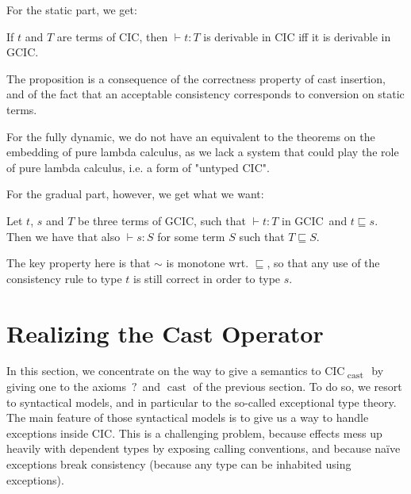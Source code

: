 \documentclass[en]{myarticle}
\renewcommand{\mathtt}{\mathrm}
\newcommand{\cons}{\sim}
\newcommand{\pre}{\sqsubseteq}
\DeclareMathOperator{\?}{?}
\newcommand{\cas}{\operatorname{\mathtt{cast}}}
\newcommand{\gcic}{GCIC}
\newcommand{\cacic}{CIC\textsubscript{$\cas$}}
\begin{document}
{For the static part, we get:
\begin{prop}[Embedding of CIC in \cacic]
	If $t$ and $T$ are terms of CIC, then $\vdash t : T$ is derivable in CIC iff it is derivable in \gcic.
\end{prop}
\begin{dem}[Sketch]
	The proposition is a consequence of the correctness property of cast insertion, and of the fact that an acceptable consistency corresponds to conversion on static terms.
\end{dem}

For the fully dynamic, we do not have an equivalent to the theorems on the embedding of pure lambda calculus, as we lack a system that could play the role of pure lambda calculus, i.e. a form of "untyped CIC".


For the gradual part, however, we get what we want:
\begin{prop}
	Let $t$, $s$ and $T$ be three terms of \gcic, such that $\vdash t : T$ in \gcic\ and $t \pre s$. Then we have that also $\vdash s : S$ for some term $S$ such that $T \pre S$.
\end{prop}
\begin{dem}[Sketch]
	The key property here is that $\cons$ is monotone wrt. $\pre$, so that any use of the consistency rule to type $t$ is still correct in order to type $s$.
\end{dem}


\section{Realizing the Cast Operator}
\label{cast}

In this section, we concentrate on the way to give a semantics to \cacic\ by giving one to the axioms $\?$ and $\cas$ of the previous section. To do so, we resort to syntactical models, and in particular to the so-called exceptional type theory. The main feature of those syntactical models is to give us a way to handle exceptions inside CIC. This is a challenging problem, because effects mess up heavily with dependent types by exposing calling conventions, and because naïve exceptions break consistency (because any type can be inhabited using exceptions).

}
\end{document}
